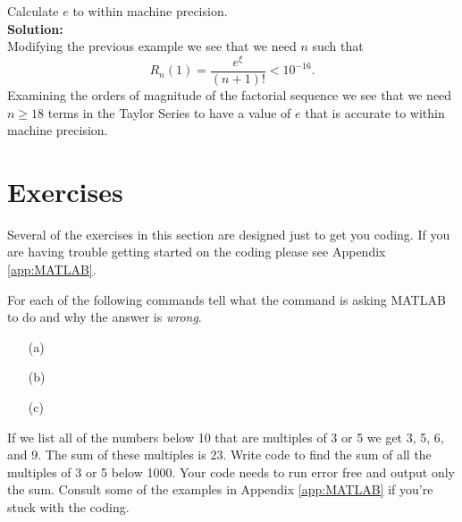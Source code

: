\begin{example}
    Calculate $e$ to within machine precision. \\{\bf Solution:}\\
    Modifying the previous example we see that we need $n$ such that 
    \[ R_n(1) = \frac{e^\xi}{(n+1)!} < 10^{-16}. \]
    Examining the orders of magnitude of the factorial sequence we see that we need $n \ge
    18$ terms in the Taylor Series to have a value of $e$ that is accurate to within
    machine precision.
\end{example}


\newpage\section{Exercises}
Several of the exercises in this section are designed just to get you coding.  If you are
having trouble getting started on the coding please see Appendix \ref{app:MATLAB}.

\begin{problem}
    For each of the following commands tell what the command is asking MATLAB to do and
    why the answer is {\it wrong}.
    \begin{enumerate}
        \item[(a)] 
        \item[(b)] 
        \item[(c)] 
    \end{enumerate}
\end{problem}



\begin{problem}
    If we list all of the numbers below 10 that are multiples of 3 or 5 we get 3, 5, 6,
    and 9.  The sum of these multiples is 23.  Write code to find the sum of all the
    multiples of 3 or 5 below 1000.  Your code needs to run error free and output only the
    sum.  Consult some of the examples in Appendix \ref{app:MATLAB} if you're stuck with
    the coding.
\end{problem}


